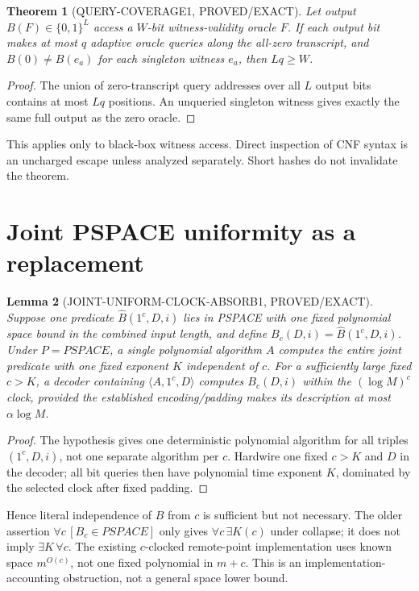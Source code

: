 \documentclass[11pt]{article}
\newtheorem{theorem}{Theorem}
\newtheorem{lemma}[theorem]{Lemma}
\begin{document}
\begin{theorem}[QUERY-COVERAGE1, PROVED/EXACT]
Let output \(B(F)\in\{0,1\}^L\) access a
\(W\)-bit witness-validity oracle \(F\).
If each output bit makes at most \(q\) adaptive
oracle queries along the all-zero transcript, and
\(B(0)\ne B(e_a)\) for each singleton witness
\(e_a\), then \(Lq\ge W\).
\end{theorem}
\begin{proof}
The union of zero-transcript query addresses over all
\(L\) output bits contains at most \(Lq\) positions.
An unqueried singleton witness gives exactly the
same full output as the zero oracle.
\end{proof}
This applies only to black-box witness access.
Direct inspection of CNF syntax is an uncharged escape
unless analyzed separately. Short hashes do not
invalidate the theorem.

\section{Joint PSPACE uniformity as a replacement}
\begin{lemma}[JOINT-UNIFORM-CLOCK-ABSORB1, PROVED/EXACT]
Suppose one predicate \(\widehat B(1^c,D,i)\)
lies in PSPACE with one fixed polynomial space bound
in the combined input length, and define
\(B_c(D,i)=\widehat B(1^c,D,i)\).
Under \(P=PSPACE\), a single polynomial algorithm
\(A\) computes the entire joint predicate with
one fixed exponent \(K\) independent of \(c\).
For a sufficiently large fixed \(c>K\),
a decoder containing \(\langle A,1^c,D\rangle\)
computes \(B_c(D,i)\) within the
\((\log M)^c\) clock, provided the established
encoding/padding makes its description at most
\(\alpha\log M\).
\end{lemma}
\begin{proof}
The hypothesis gives one deterministic polynomial
algorithm for all triples \((1^c,D,i)\), not one
separate algorithm per \(c\).
Hardwire one fixed \(c>K\) and \(D\) in the decoder;
all bit queries then have polynomial time exponent \(K\),
dominated by the selected clock after fixed padding.
\end{proof}
Hence literal independence of \(B\) from \(c\)
is sufficient but not necessary.
The older assertion \(\forall c\,[B_c\in PSPACE]\)
only gives \(\forall c\,\exists K(c)\) under collapse;
it does not imply \(\exists K\,\forall c\).
The existing \(c\)-clocked remote-point implementation
uses known space \(m^{O(c)}\), not one fixed polynomial
in \(m+c\). This is an implementation-accounting
obstruction, not a general space lower bound.
\end{document}
